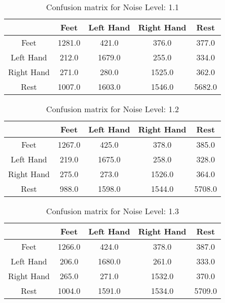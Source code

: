 \begin{table}[!htbp]
    \centering
    \begin{tabular}{|c||c|c|c|c|}
        \hline
		 & Feet & Left Hand & Right Hand & Rest \\
        \hline
        \hline
        Feet & 1281.0 & 421.0 & 376.0 & 377.0 \\
        \hline
        Left Hand & 212.0 & 1679.0 & 255.0 & 334.0 \\
        \hline
        Right Hand & 271.0 & 280.0 & 1525.0 & 362.0 \\
        \hline
        Rest & 1007.0 & 1603.0 & 1546.0 & 5682.0 \\
        \hline
    \end{tabular}
    \caption{Confusion matrix for Noise Level: 1.1}
\end{table}

\begin{table}[!htbp]
    \centering
    \begin{tabular}{|c||c|c|c|c|}
        \hline
		 & Feet & Left Hand & Right Hand & Rest \\
        \hline
        \hline
        Feet & 1267.0 & 425.0 & 378.0 & 385.0 \\
        \hline
        Left Hand & 219.0 & 1675.0 & 258.0 & 328.0 \\
        \hline
        Right Hand & 275.0 & 273.0 & 1526.0 & 364.0 \\
        \hline
        Rest & 988.0 & 1598.0 & 1544.0 & 5708.0 \\
        \hline
    \end{tabular}
    \caption{Confusion matrix for Noise Level: 1.2}
\end{table}

\begin{table}[!htbp]
    \centering
    \begin{tabular}{|c||c|c|c|c|}
        \hline
		 & Feet & Left Hand & Right Hand & Rest \\
        \hline
        \hline
        Feet & 1266.0 & 424.0 & 378.0 & 387.0 \\
        \hline
        Left Hand & 206.0 & 1680.0 & 261.0 & 333.0 \\
        \hline
        Right Hand & 265.0 & 271.0 & 1532.0 & 370.0 \\
        \hline
        Rest & 1004.0 & 1591.0 & 1534.0 & 5709.0 \\
        \hline
    \end{tabular}
    \caption{Confusion matrix for Noise Level: 1.3}
\end{table}

